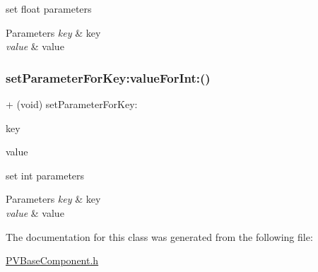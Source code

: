set float parameters


\begin{DoxyParams}{Parameters}
{\em key} & key \\
\hline
{\em value} & value \\
\hline
\end{DoxyParams}
\mbox{\label{interface_p_v_base_component_a8823275eace0c9358aaf7c0ba7d8cffe}} 
\subsubsection{\texorpdfstring{set\+Parameter\+For\+Key\+:value\+For\+Int\+:()}{setParameterForKey:valueForInt:()}}
{\footnotesize\ttfamily + (void) set\+Parameter\+For\+Key\+: \begin{DoxyParamCaption}\item[{(N\+S\+String $\ast$\+\_\+\+Nonnull)}]{key }\item[{valueForInt:(int)}]{value }\end{DoxyParamCaption}}

set int parameters


\begin{DoxyParams}{Parameters}
{\em key} & key \\
\hline
{\em value} & value \\
\hline
\end{DoxyParams}


The documentation for this class was generated from the following file\+:\begin{DoxyCompactItemize}
\item 
\hyperlink{_p_v_base_component_8h}{P\+V\+Base\+Component.\+h}\end{DoxyCompactItemize}
